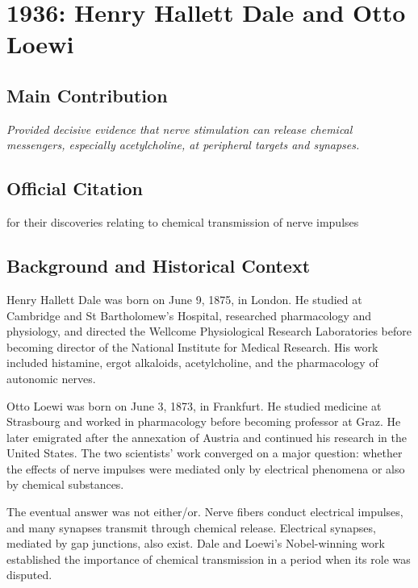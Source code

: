 \chapter[1936 --- Dale et al.]{1936: Henry Hallett Dale and Otto Loewi}
\label{ch:1936_Dale}

\section*{Main Contribution}

\textit{Provided decisive evidence that nerve stimulation can release chemical messengers, especially acetylcholine, at peripheral targets and synapses.}\cite{nobel-1936,lecture-1936,lecture-loewi-1936}

\section{Official Citation}

for their discoveries relating to chemical transmission of nerve impulses\cite{nobel-1936}

\section{Background and Historical Context}

Henry Hallett Dale was born on June 9, 1875, in London. He studied at Cambridge and St Bartholomew's Hospital, researched pharmacology and physiology, and directed the Wellcome Physiological Research Laboratories before becoming director of the National Institute for Medical Research. His work included histamine, ergot alkaloids, acetylcholine, and the pharmacology of autonomic nerves.

Otto Loewi was born on June 3, 1873, in Frankfurt. He studied medicine at Strasbourg and worked in pharmacology before becoming professor at Graz. He later emigrated after the annexation of Austria and continued his research in the United States. The two scientists' work converged on a major question: whether the effects of nerve impulses were mediated only by electrical phenomena or also by chemical substances.

The eventual answer was not either/or. Nerve fibers conduct electrical impulses, and many synapses transmit through chemical release. Electrical synapses, mediated by gap junctions, also exist. Dale and Loewi's Nobel-winning work established the importance of chemical transmission in a period when its role was disputed.

